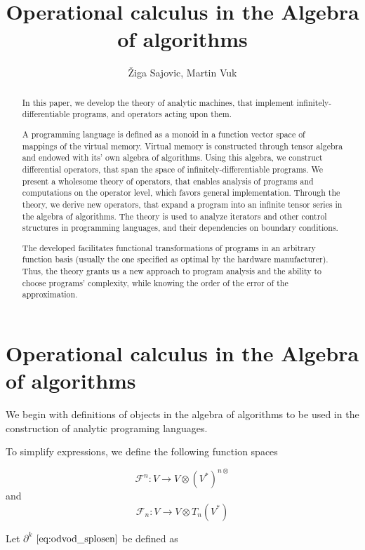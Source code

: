 \documentclass{article}
\title{Operational calculus in the Algebra of algorithms}
\author{Žiga Sajovic, Martin Vuk}
\newcommand{\F}{\mathcal{F}}
\newcommand{\D}{\partial}
\begin{document}
\maketitle
\begin{abstract}
In this paper, we develop the theory of analytic machines, that implement infinitely-differentiable programs, and operators acting upon them.

A programming language is defined as a monoid in a function vector space of mappings of the virtual memory. Virtual memory is constructed through tensor algebra and endowed with its' own algebra of algorithms. Using this algebra, we construct differential operators, that span the space of infinitely-differentiable programs. We present a wholesome theory of operators, that enables analysis of programs and computations on the operator level, which favors general implementation. Through the theory, we derive new operators, that expand a program into an infinite tensor series in the algebra of algorithms. The theory is used to analyze iterators and other control structures in programming languages, and their dependencies on boundary conditions.

The developed facilitates functional transformations of programs in an arbitrary function basis (usually the one specified as optimal by the hardware manufacturer). Thus, the theory grants us a new approach to program analysis and the ability to choose programs' complexity, while knowing the order of the error of the approximation.
\end{abstract}
 
 \section{Operational calculus in the Algebra of algorithms}

We begin with definitions of objects in the algebra of algorithms to be used in the construction of analytic programing languages.

To simplify expressions, we define the following function spaces

 \begin{equation}\label{eq:F^n}
 	\F^n:V\to V\otimes(V^*)^{n\otimes}
 \end{equation}
 and
 \begin{equation}\label{eq:F_n}
 	\F_n:V\to V\otimes T_n(V^*)
 \end{equation}
 
Let $\D^k$ $\eqref{eq:odvod_splosen}$ be defined as
\end{document}
